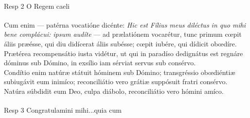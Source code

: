 \documentclass[options]{article}
\begin{document}
\\
Resp 2 O Regem caeli\\
\\
Cum enim — patérna vocatióne dicénte: \emph{Hic est Fílius meus diléctus in quo mihi bene complácui: ipsum audíte} — ad prælatiónem vocarétur, tunc primum cœpit áliis præésse, qui diu didícerat áliis subésse; cœpit iubére, qui dídicit obœdíre. Prætérea recompensátio iusta vidétur, ut qui in paradíso dedignátus est regnáre dóminus sub Dómino, in exsílio iam sérviat servus sub consérvo.\\
Condítio enim natúræ státuit hóminem sub Dómino; transgréssio obœdiéntiæ subiugávit eum inimíco; reconciliátio vero grátiæ suppósuit fratri consérvo. Natúra súbdidit eum Deo, culpa diábolo, reconciliátio vero hómini amíco.
\\\\
Resp 3 Congratulamini mihi...quia cum
\end{document}
